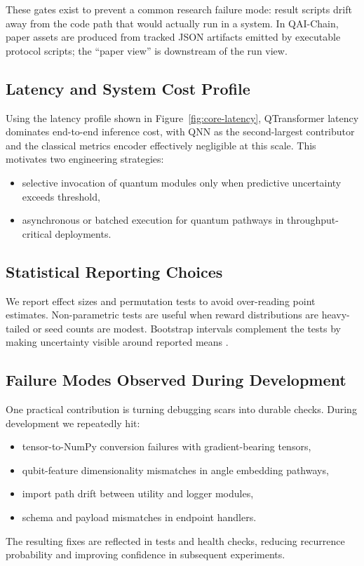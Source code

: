 These gates exist to prevent a common research failure mode: result scripts drift away from the code path that would actually run in a system. In QAI-Chain, paper assets are produced from tracked JSON artifacts emitted by executable protocol scripts; the ``paper view'' is downstream of the run view.

\subsection{Latency and System Cost Profile}
\label{sec:latency-profile}

Using the latency profile shown in Figure~\ref{fig:core-latency}, QTransformer latency dominates end-to-end inference cost, with QNN as the second-largest contributor and the classical metrics encoder effectively negligible at this scale. This motivates two engineering strategies:
\begin{itemize}
  \item selective invocation of quantum modules only when predictive uncertainty exceeds threshold,
  \item asynchronous or batched execution for quantum pathways in throughput-critical deployments.
\end{itemize}

\subsection{Statistical Reporting Choices}

We report effect sizes and permutation tests to avoid over-reading point estimates. Non-parametric tests are useful when reward distributions are heavy-tailed or seed counts are modest. Bootstrap intervals complement the tests by making uncertainty visible around reported means \cite{efron1994introduction,good2005permutation}.

\subsection{Failure Modes Observed During Development}

One practical contribution is turning debugging scars into durable checks. During development we repeatedly hit:
\begin{itemize}
  \item tensor-to-NumPy conversion failures with gradient-bearing tensors,
  \item qubit-feature dimensionality mismatches in angle embedding pathways,
  \item import path drift between utility and logger modules,
  \item schema and payload mismatches in endpoint handlers.
\end{itemize}

The resulting fixes are reflected in tests and health checks, reducing recurrence probability and improving confidence in subsequent experiments.
